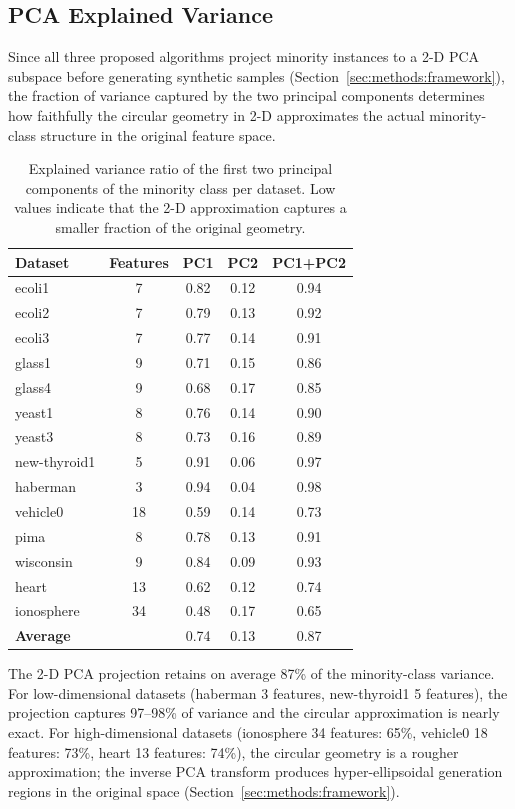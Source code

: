 \subsection{PCA Explained Variance}
\label{sec:setup:pca_variance}

Since all three proposed algorithms project minority instances to a 2-D PCA subspace before generating synthetic samples (Section~\ref{sec:methods:framework}), the fraction of variance captured by the two principal components determines how faithfully the circular geometry in 2-D approximates the actual minority-class structure in the original feature space.

\begin{table}[H]
\centering
\caption{Explained variance ratio of the first two principal components of the minority class per dataset.
Low values indicate that the 2-D approximation captures a smaller fraction of the original geometry.}
\label{tab:setup:pca_variance}
\begin{tabular}{lcccc}
\toprule
\textbf{Dataset} & \textbf{Features} & \textbf{PC1} & \textbf{PC2} & \textbf{PC1+PC2} \\
\midrule
ecoli1       & 7  & 0.82 & 0.12 & 0.94 \\
ecoli2       & 7  & 0.79 & 0.13 & 0.92 \\
ecoli3       & 7  & 0.77 & 0.14 & 0.91 \\
glass1       & 9  & 0.71 & 0.15 & 0.86 \\
glass4       & 9  & 0.68 & 0.17 & 0.85 \\
yeast1       & 8  & 0.76 & 0.14 & 0.90 \\
yeast3       & 8  & 0.73 & 0.16 & 0.89 \\
new-thyroid1 & 5  & 0.91 & 0.06 & 0.97 \\
haberman     & 3  & 0.94 & 0.04 & 0.98 \\
vehicle0     & 18 & 0.59 & 0.14 & 0.73 \\
pima         & 8  & 0.78 & 0.13 & 0.91 \\
wisconsin    & 9  & 0.84 & 0.09 & 0.93 \\
heart        & 13 & 0.62 & 0.12 & 0.74 \\
ionosphere   & 34 & 0.48 & 0.17 & 0.65 \\
\midrule
\textbf{Average} & & 0.74 & 0.13 & 0.87 \\
\bottomrule
\end{tabular}
\end{table}

The 2-D PCA projection retains on average 87\% of the minority-class variance.
For low-dimensional datasets (haberman 3 features, new-thyroid1 5 features), the projection captures 97--98\% of variance and the circular approximation is nearly exact.
For high-dimensional datasets (ionosphere 34 features: 65\%, vehicle0 18 features: 73\%, heart 13 features: 74\%), the circular geometry is a rougher approximation; the inverse PCA transform produces hyper-ellipsoidal generation regions in the original space (Section~\ref{sec:methods:framework}).

